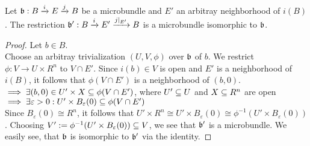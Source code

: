  \\
Let $\bb: \bundle{B}{E}{i}{j}$ be a microbundle and $E'$ an arbitray neighborhood of $i(B)$.
The restriction $\bundledef{\bb'}{B}{E'}{i}{j\restr{E'}}$ is a microbundle isomorphic to $\bb$.
\begin{proof}
Let $b \in B$. \\
Choose an arbitray trivialization $(U, V, \phi)$ over $\bb$ of $b$.
We restrict $\phi: V \to U \times R^n$ to $V \cap E'$.
Since $i(b) \in V$ is open and $E'$ is a neighborhood of $i(B)$, it follows that $\phi(V \cap E')$ is a neighborhood of $(b, 0)$.
\\ $\implies \exists (b, 0) \in U' \times X \sub \phi(V \cap E')$, where $U' \sub U$ and $X \sub R^n$ are open
\\ $\implies \exists \varepsilon > 0: U' \times B_\varepsilon(0) \sub \phi(V \cap E')$ \\
Since $B_\varepsilon(0) \cong R^n$, it follows that $U' \times R^n \cong U' \times B_\varepsilon(0) \cong \phi^{-1}(U' \times B_\varepsilon(0))$.
Choosing $V' := \phi^{-1}(U' \times B_\varepsilon(0)) \sub V$, we see that $\bb'$ is a microbundle.
We easily see, that $\bb$ is isomorphic to $\bb'$ via the identity.
\end{proof}